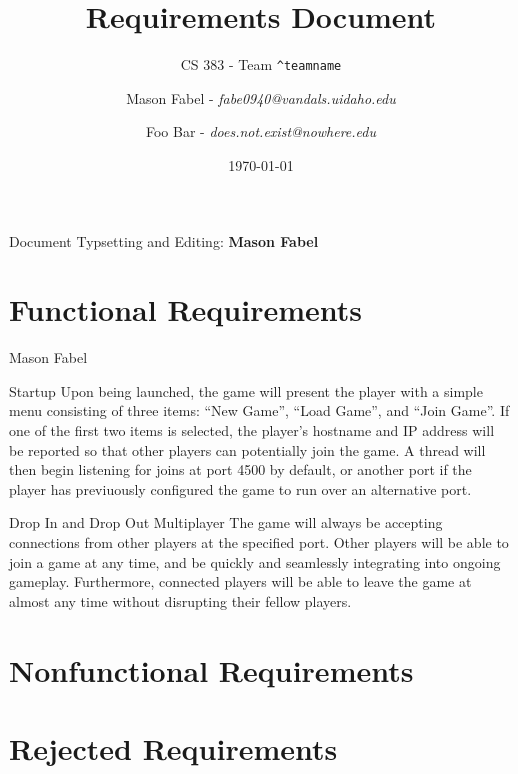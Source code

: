 \documentclass[12pt]{report}
\title{Requirements Document}
\subtitle{CS 383 - Team \texttt{\textasciicircum teamname}}
\author{
Mason Fabel - \textit{fabe0940@vandals.uidaho.edu} \\
\and Foo Bar - \textit{does.not.exist@nowhere.edu} \\
}
\date{\today}
\begin{document}
\maketitle

\tableofcontents
Document Typsetting and Editing: \textbf{Mason Fabel}
\clearpage

\chapter{Functional Requirements}

\begin{section}{Mason Fabel}
\begin{subsection}{Startup}
Upon being launched, the game will present the player with a simple menu
consisting of three items: ``New Game'', ``Load Game'', and ``Join Game''.
If one of the first two items is selected, the player's hostname and IP
address will be reported so that other players can potentially join the
game. A thread will then begin listening for joins at port 4500 by default,
or another port if the player has previuously configured the game to run
over an alternative port.
\end{subsection}

\begin{subsection}{Drop In and Drop Out Multiplayer}
The game will always be accepting connections from other players at the
specified port. Other players will be able to join a game at any time, and
be quickly and seamlessly integrating into ongoing gameplay. Furthermore,
connected players will be able to leave the game at almost any time without
disrupting their fellow players.
\end{subsection}
\end{section}

\chapter{Nonfunctional Requirements}

\chapter{Rejected Requirements}
\end{document}
